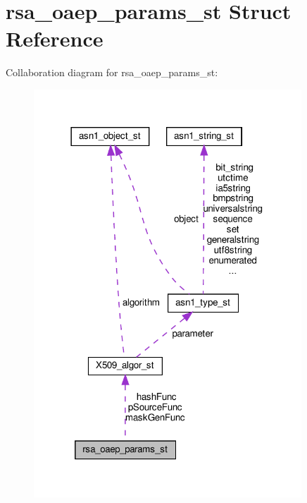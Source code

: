 \hypertarget{structrsa__oaep__params__st}{}\section{rsa\+\_\+oaep\+\_\+params\+\_\+st Struct Reference}
\label{structrsa__oaep__params__st}


Collaboration diagram for rsa\+\_\+oaep\+\_\+params\+\_\+st\+:
\nopagebreak
\begin{figure}[H]
\begin{center}
\leavevmode
\includegraphics[width=285pt]{structrsa__oaep__params__st__coll__graph}
\end{center}
\end{figure}
